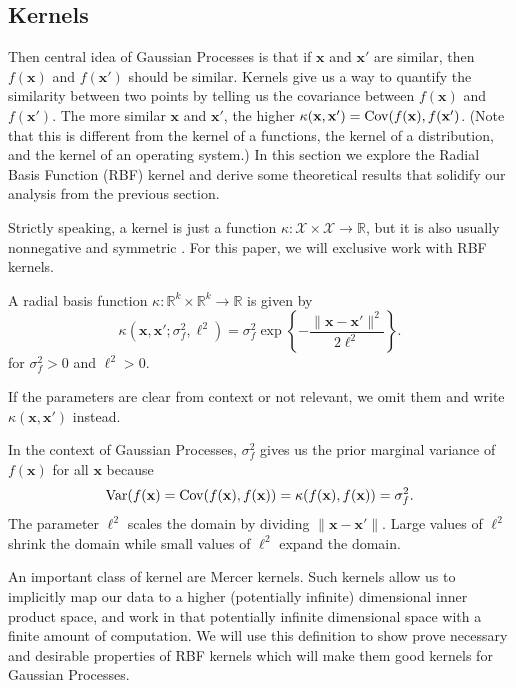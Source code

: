 \subsection{Kernels}

Then central idea of Gaussian Processes is that if $\mathbf{x}$ and $\mathbf{x}'$ are similar, then $f(\mathbf{x})$ and $f(\mathbf{x}')$ should be similar.
Kernels give us a way to quantify the similarity between two points by telling us the covariance between $f(\mathbf{x})$ and $f(\mathbf{x}')$.
The more similar $\mathbf{x}$ and $\mathbf{x}'$, the higher $\kappa(\mathbf{x}, \mathbf{x}') = \operatorname{Cov}(f(\mathbf{x}), f(\mathbf{x}')$.
(Note that this is different from the kernel of a functions, the kernel of a distribution, and the kernel of an operating system.)
In this section we explore the Radial Basis Function (RBF) kernel and derive some theoretical results that solidify our analysis from the previous section.

Strictly speaking, a kernel is just a function $\kappa: \mathcal{X} \times \mathcal{X} \to \mathbb{R}$, but it is also usually nonnegative and symmetric \cite{murphy2012}.
For this paper, we will exclusive work with RBF kernels.

\begin{definition}
    A radial basis function $\kappa: \mathbb{R}^{k} \times \mathbb{R}^{k} \to \mathbb{R}$
    is given by
    \begin{equation*}
        \kappa(\mathbf{x}, \mathbf{x}'; \sigma_f^2, \ell^2)
        = \sigma_f^{2} \exp \left\{ - \frac{ \lVert \mathbf{x} - \mathbf{x}' \rVert^2 }{ 2 \ell^2 }\right\}.
    \end{equation*}
    for $\sigma_f^2 > 0$ and $\ell^2 > 0$.
    
    If the parameters are clear from context or not relevant, we omit them and write $\kappa(\mathbf{x}, \mathbf{x}')$ instead.
\end{definition}
In the context of Gaussian Processes, $\sigma_f^2$ gives us the prior marginal variance of $f(\mathbf{x})$ for all $\mathbf{x}$ because
\begin{equation*}
    \operatorname{Var}(f(\mathbf{x}) = \operatorname{Cov}(f(\mathbf{x}), f(\mathbf{x})) = \kappa(f(\mathbf{x}), f(\mathbf{x})) = \sigma_f^2.
\end{equation*}
The parameter $\ell^2$ scales the domain by dividing $\lVert \mathbf{x} - \mathbf{x}' \rVert$.
Large values of $\ell^2$ shrink the domain while small values of $\ell^2$ expand the domain.

An important class of kernel are Mercer kernels.
Such kernels allow us to implicitly map our data to a higher (potentially infinite) dimensional inner product space, and work in that potentially infinite dimensional space with a finite amount of computation.
We will use this definition to show prove necessary and desirable properties of RBF kernels which will make them good kernels for Gaussian Processes.

